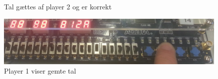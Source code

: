 \begin{enumerate}
\begin{figure}[h]
			\caption{Tal gættes af player 2 og er korrekt}
			\label{fig:Guess2pTryOk}
		\end{figure}
		\begin{figure}[h]
			\centering
			\includegraphics[scale=0.15]{pictures/Oevelse5/opg3/guess_2p_show.JPG}
			\caption{Player 1 viser gemte tal}
			\label{fig:Guess2pShow}
		\end{figure}
\end{enumerate}